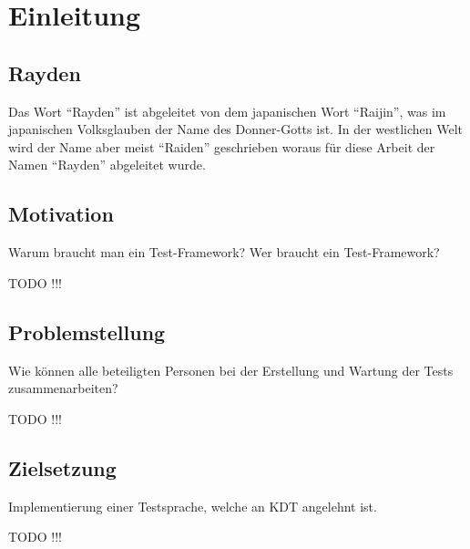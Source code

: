 \chapter{Einleitung}
\label{cha:Einleitung}

\section{Rayden}

Das Wort "`Rayden"' ist abgeleitet von dem japanischen Wort "`Raijin"', was im japanischen Volksglauben der Name des Donner-Gotts ist. In der westlichen Welt wird der Name aber meist "`Raiden"' geschrieben woraus für diese Arbeit der Namen "`Rayden"' abgeleitet wurde.

\section{Motivation}

Warum braucht man ein Test-Framework?
Wer braucht ein Test-Framework?

TODO !!!

\section{Problemstellung}

Wie können alle beteiligten Personen bei der Erstellung und Wartung der Tests zusammenarbeiten?

TODO !!!

\section{Zielsetzung}

Implementierung einer Testsprache, welche an KDT angelehnt ist.

TODO !!!
